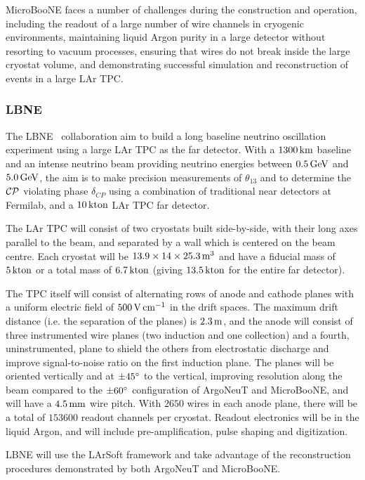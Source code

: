 MicroBooNE faces a number of challenges during the construction and operation, including the readout of a large number of wire channels in cryogenic environments, maintaining liquid Argon purity in a large detector without resorting to vacuum processes, ensuring that wires do not break inside the large cryostat volume, and demonstrating successful simulation and reconstruction of events in a large \acs{LAr TPC}.

\subsubsection{LBNE}
The LBNE~\citep{LBNE} collaboration aim to build a long baseline neutrino oscillation experiment using a large \acs{LAr TPC} as the far detector. With a $1300\km$ baseline and an intense neutrino beam providing neutrino energies between $0.5\GeV$ and $5.0\GeV$, the aim is to make precision measurements of $\theta_{13}$ and to determine the $\Charge\Parity$ violating phase $\delta_{CP}$ using a combination of traditional near detectors at Fermilab, and a $10\kton$ \acs{LAr TPC} far detector.

The \acs{LAr TPC} will consist of two cryostats built side-by-side, with their long axes parallel to the beam, and separated by a wall which is centered on the beam centre. Each cryostat will be $13.9\times 14\times 25.3\metre^3$ and have a fiducial mass of $5\kton$ or a total mass of $6.7\kton$ (giving $13.5\kton$ for the entire far detector).

The TPC itself will consist of alternating rows of anode and cathode planes with a uniform electric field of $500\volt\cm^{-1}$ in the drift spaces. The maximum drift distance (i.e. the separation of the planes) is $2.3\metre$, and the anode will consist of three instrumented wire planes (two induction and one collection) and a fourth, uninstrumented, plane to shield the others from electrostatic discharge and improve signal-to-noise ratio on the first induction plane. The planes will be oriented vertically and at $\pm45\degree$ to the vertical, improving resolution along the beam compared to the $\pm60\degree$ configuration of ArgoNeuT and MicroBooNE, and will have a $4.5\mm$ wire pitch. With $2650$ wires in each anode plane, there will be a total of $153600$ readout channels per cryostat. Readout electronics will be in the liquid Argon, and will include pre-amplification, pulse shaping and digitization.

LBNE will use the LArSoft framework and take advantage of the reconstruction procedures demonstrated by both ArgoNeuT and MicroBooNE.

